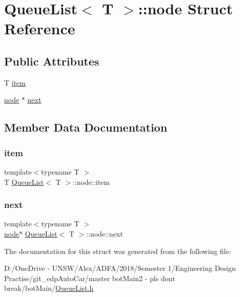 \hypertarget{struct_queue_list_1_1node}{}\section{Queue\+List$<$ T $>$\+:\+:node Struct Reference}
\label{struct_queue_list_1_1node}
\subsection*{Public Attributes}
\begin{DoxyCompactItemize}
\item 
T \mbox{\hyperlink{struct_queue_list_1_1node_a5701b20aecba36b372075e7f35ea7420}{item}}
\item 
\mbox{\hyperlink{struct_queue_list_1_1node}{node}} $\ast$ \mbox{\hyperlink{struct_queue_list_1_1node_af2e16add8c76efb904932f56b6a33d15}{next}}
\end{DoxyCompactItemize}


\subsection{Member Data Documentation}
\mbox{\label{struct_queue_list_1_1node_a5701b20aecba36b372075e7f35ea7420}} 
\subsubsection{\texorpdfstring{item}{item}}
{\footnotesize\ttfamily template$<$typename T $>$ \\
T \mbox{\hyperlink{class_queue_list}{Queue\+List}}$<$ T $>$\+::node\+::item}

\mbox{\label{struct_queue_list_1_1node_af2e16add8c76efb904932f56b6a33d15}} 
\subsubsection{\texorpdfstring{next}{next}}
{\footnotesize\ttfamily template$<$typename T $>$ \\
\mbox{\hyperlink{struct_queue_list_1_1node}{node}}$\ast$ \mbox{\hyperlink{class_queue_list}{Queue\+List}}$<$ T $>$\+::node\+::next}



The documentation for this struct was generated from the following file\+:\begin{DoxyCompactItemize}
\item 
D\+:/\+One\+Drive -\/ U\+N\+S\+W/\+Alex/\+A\+D\+F\+A/2018/\+Semester 1/\+Engineering Design Practise/git\+\_\+edp\+Auto\+Car/master bot\+Main2 -\/ pls dont break/bot\+Main/\mbox{\hyperlink{_queue_list_8h}{Queue\+List.\+h}}\end{DoxyCompactItemize}
